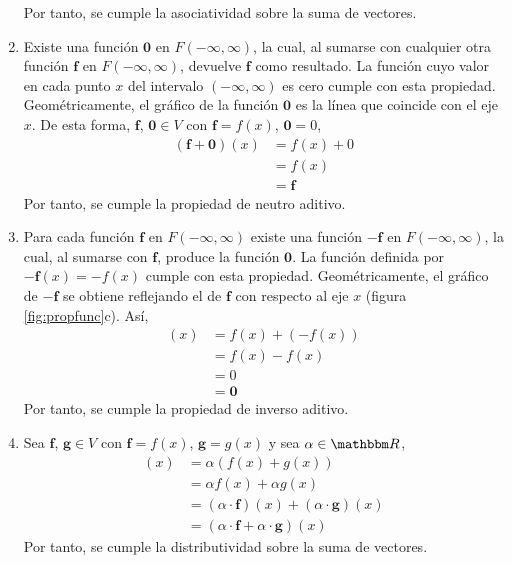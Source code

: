 \begin{examplebox}{}{}
\begin{enumerate}[label=\roman*), topsep=6pt, itemsep=0pt]
        Por tanto, se cumple la asociatividad sobre la suma de vectores.
        \item Existe una función $\mathbf{0}$ en $F(-\infty, \infty)$, la cual, al sumarse con cualquier otra función $\mathbf{f}$ en $F(-\infty, \infty)$, devuelve $\mathbf{f}$ como resultado. La función cuyo valor en cada punto $x$ del intervalo $(-\infty, \infty)$ es cero cumple con esta propiedad. Geométricamente, el gráfico de la función $\mathbf{0}$ es la línea que coincide con el eje $x$. De esta forma, $\mathbf{f}$, $\mathbf{0} \in V$ con $\mathbf{f} = f(x)$, $\mathbf{0} = 0$,
        \begin{align*}
            (\mathbf{f} + \mathbf{0})(x) & = f(x) + 0 \\
            & = f(x) \\
            & = \mathbf{f}
        \end{align*}
        Por tanto, se cumple la propiedad de neutro aditivo.
        \item Para cada función $\mathbf{f}$ en $F(-\infty, \infty)$ existe una función $-\mathbf{f}$ en $F(-\infty, \infty)$, la cual, al sumarse con $\mathbf{f}$, produce la función $\mathbf{0}$. La función definida por $-\mathbf{f}(x) = -f(x)$ cumple con esta propiedad. Geométricamente, el gráfico de $-\mathbf{f}$ se obtiene reflejando el de $\mathbf{f}$ con respecto al eje $x$ (figura \ref{fig:propfunc}c). Así,
        \begin{align*}
            [\mathbf{f} + (-\mathbf{f})](x) & = f(x) + (-f(x)) \\
            & = f(x) - f(x) \\
            & = 0 \\
            & = \mathbf{0}
        \end{align*}
        Por tanto, se cumple la propiedad de inverso aditivo.
        \item Sea $\mathbf{f}$, $\mathbf{g} \in V$ con $\mathbf{f} = f(x)$, $\mathbf{g} = g(x)$ y sea $\alpha \in \RR$,
        \begin{align*}
            [\alpha \cdot (\mathbf{f} + \mathbf{g})](x) & = \alpha (f(x) + g(x)) \\
            & = \alpha f(x) + \alpha g(x) \\
            & = (\alpha \cdot \mathbf{f})(x) + (\alpha \cdot \mathbf{g})(x) \\
            & = (\alpha \cdot \mathbf{f} + \alpha \cdot \mathbf{g})(x)
        \end{align*}
        Por tanto, se cumple la distributividad sobre la suma de vectores.

\end{enumerate}
\end{examplebox}
